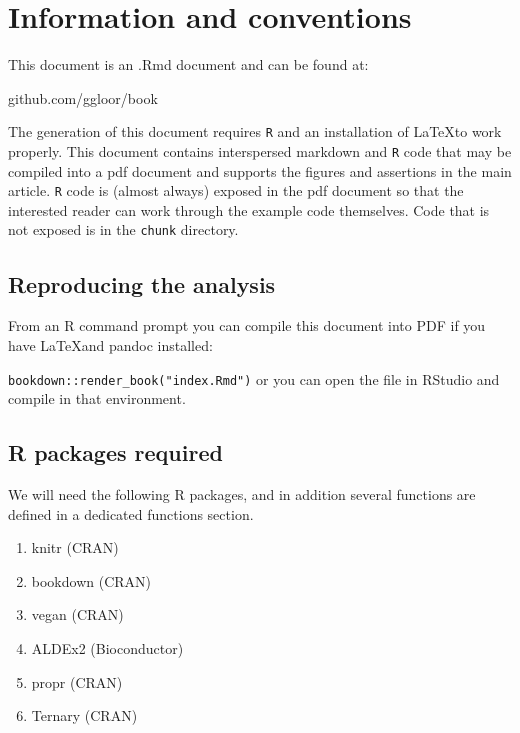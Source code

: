 \documentclass[onecolumn]{book}
\providecommand{\tightlist}{%
  \setlength{\itemsep}{0pt}\setlength{\parskip}{0pt}}
\theoremstyle{definition}
\theoremstyle{definition}
\theoremstyle{definition}
\theoremstyle{remark}
\begin{document}
\hypertarget{information-and-conventions}{%
\section*{Information and
conventions}\label{information-and-conventions}}

This document is an .Rmd document and can be found at:

github.com/ggloor/book

The generation of this document requires \texttt{R} and an installation
of \LaTeX to work properly. This document contains interspersed markdown
and \texttt{R} code that may be compiled into a pdf document and
supports the figures and assertions in the main article. \texttt{R} code
is (almost always) exposed in the pdf document so that the interested
reader can work through the example code themselves. Code that is not
exposed is in the \texttt{chunk} directory.

\hypertarget{reproducing-the-analysis}{%
\subsection{Reproducing the analysis}\label{reproducing-the-analysis}}

From an R command prompt you can compile this document into PDF if you
have \LaTeX and pandoc installed:

\texttt{bookdown::render\_book("index.Rmd")} or you can open the file in
RStudio and compile in that environment.

\hypertarget{r-packages-required}{%
\subsection{R packages required}\label{r-packages-required}}

We will need the following R packages, and in addition several functions
are defined in a dedicated functions section.

\begin{enumerate}
\def\labelenumi{\arabic{enumi}.}
\tightlist
\item
  knitr (CRAN)
\item
  bookdown (CRAN)
\item
  vegan (CRAN)
\item
  ALDEx2 (Bioconductor)
\item
  propr (CRAN)
\item
  Ternary (CRAN)
\end{enumerate}
\end{document}
